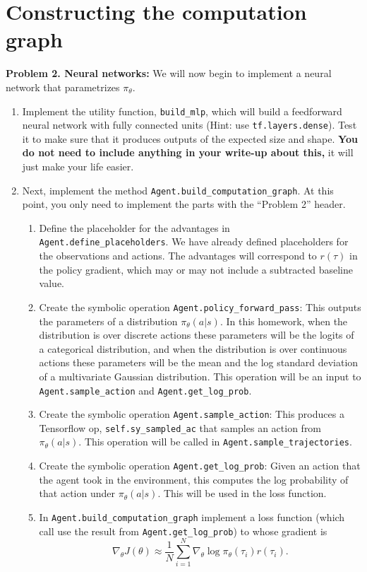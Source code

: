 \documentclass[12pt]{article}
\begin{document}
\section{Constructing the computation graph}

\textbf{Problem 2. Neural networks:} We will now begin to implement a neural network that parametrizes $\pi_\theta$.
\begin{enumerate} [label=(\alph*)]
\item Implement the utility function, \verb|build_mlp|, which will build a feedforward neural network with fully connected units (Hint: use \texttt{tf.layers.dense}). Test it to make sure that it produces outputs of the expected size and shape. \textbf{You do not need to include anything in your write-up about this,} it will just make your life easier.
\item Next, implement the method \verb|Agent.build_computation_graph|. At this point, you only need to implement the parts with the ``Problem 2'' header.
    \begin{enumerate} [label=(\roman*)]
        \item Define the placeholder for the advantages in \verb|Agent.define_placeholders|. We have already defined placeholders for the observations and actions. The advantages will correspond to $r(\tau)$ in the policy gradient, which may or may not include a subtracted baseline value.
        \item Create the symbolic operation \texttt{Agent.policy\_forward\_pass}: This outputs the parameters of a distribution $\pi_\theta(a|s)$. In this homework, when the distribution is over discrete actions these parameters will be the logits of a categorical distribution, and when the distribution is over continuous actions these parameters will be the mean and the log standard deviation of a multivariate Gaussian distribution. This operation will be an input to \texttt{Agent.sample\_action} and \texttt{Agent.get\_log\_prob}.
        \item Create the symbolic operation \texttt{Agent.sample\_action}: This produces a Tensorflow op, \texttt{self.sy\_sampled\_ac} that samples an action from $\pi_\theta(a|s)$. This operation will be called in \texttt{Agent.sample\_trajectories}.
        \item Create the symbolic operation \texttt{Agent.get\_log\_prob}: Given an action that the agent took in the environment, this computes the log probability of that action under $\pi_\theta(a|s)$. This will be used in the loss function.
        \item In \verb|Agent.build_computation_graph| implement a loss function (which call use the result from \texttt{Agent.get\_log\_prob}) to whose gradient is $$\nabla_\theta J(\theta) \approx \frac{1}{N} \sum_{i=1}^N \nabla_\theta \log \pi_\theta(\tau_i) r(\tau_i).$$
    \end{enumerate}
\end{enumerate}
\end{document}
